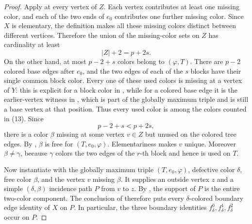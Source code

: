 \begin{proof}
Apply  at every vertex of
$Z$.  Each vertex contributes at least one missing color, and each of the
two ends of $e_0$ contributes one further missing color.  Since $X$ is
elementary, the definition  makes
all these missing colors distinct between different vertices.  Therefore
the union of the missing-color sets on $Z$ has cardinality at least
\[
 |Z|+2=p+2s. \tag{13}
\]
On the other hand, at most $p-2+s$ colors belong to
$(\varphi,T)$.  There are $p-2$ colored base
edges after $e_0$, and the two edges of each of the $s$ blocks have their
single common block color.  Every one of these used colors is missing at
a vertex of $Y$: this is explicit for a block color in
, while for a colored base edge
it is the earlier-vertex witness in , which is
part of the globally maximum triple and is still a base vertex at that
position.  Thus every used color is among the colors counted in (13).
Since
\[
 p-2+s<p+2s,
\]
there is a color $\beta$ missing at some vertex $v\in Z$ but unused on
the colored tree edges.  By , $\beta$ is free
for $(T,e_0,\varphi)$.  Elementariness makes $v$ unique.  Moreover
$\beta\ne\gamma$, because $\gamma$ colors the two edges of the
$r$-th block and hence is used on $T$.

Now instantiate  with the
globally maximum triple $(T,e_0,\varphi)$, defective color $\delta$,
free color $\beta$, and the vertex $v$ missing $\beta$.  It supplies an
outside vertex $z$ and a simple $(\delta,\beta)$ incidence path $P$ from
$v$ to $z$.  By , the support of $P$
is the entire two-color component.  The conclusion of
 therefore puts every
$\delta$-colored boundary edge identity of $X$ on $P$.  In particular,
the three boundary identities $f^0_\delta,f^1_\delta,f^2_\delta$ occur
on $P$.


\end{proof}
